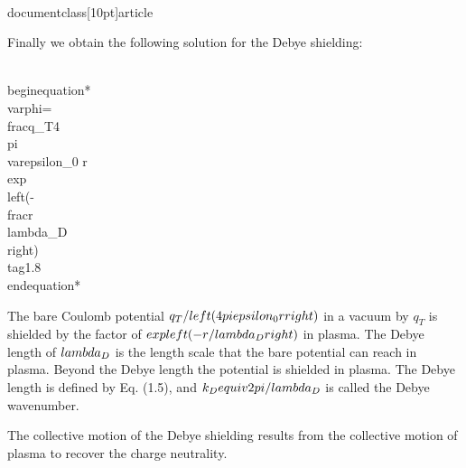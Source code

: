 \\documentclass[10pt]{article}
\begin{document}
Finally we obtain the following solution for the Debye shielding:


\\begin{equation*}
\\varphi=\\frac{q_{T}}{4 \\pi \\varepsilon_{0} r} \\exp \\left(-\\frac{r}{\\lambda_{D}}\\right) \\tag{1.8}
\\end{equation*}


The bare Coulomb potential $q_{T} /\\left(4 \\pi \\epsilon_{0} r\\right)$ in a vacuum by $q_{T}$ is shielded by the factor of $\\exp \\left(-r / \\lambda_{D}\\right)$ in plasma. The Debye length of $\\lambda_{D}$ is the length scale that the bare potential can reach in plasma. Beyond the Debye length the potential is shielded in plasma. The Debye length is defined by Eq. (1.5), and $k_{D} \\equiv 2 \\pi / \\lambda_{D}$ is called the Debye wavenumber.

The collective motion of the Debye shielding results from the collective motion of plasma to recover the charge neutrality.
\end{document}
